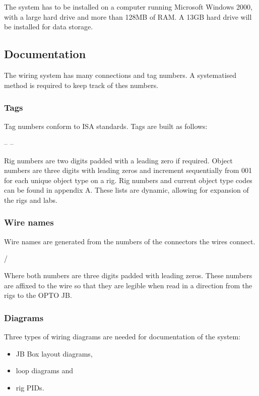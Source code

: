 The system has to be installed on a computer running Microsoft Windows 2000, with a large hard drive and more than 128MB of RAM.  A 13GB hard drive will be installed for data storage.

\subsection{Documentation}
The wiring system has many connections and tag numbers.  A systematised method is required to keep track of thes numbers.
\subsubsection{Tags}
Tag numbers conform to ISA standards.  Tags are built as follows:\bigskip

\begin{centering}
	 --  --  \bigskip \\
\end{centering}

Rig numbers are two digits padded with a leading zero if required.  Object numbers are three digits with leading zeros and increment sequentially from 001 for each unique object type on a rig.  Rig numbers and current object type codes can be found in appendix A.  These lists are dynamic, allowing for expansion of the rigs and labs.

\subsubsection{Wire names}
Wire names are generated from the numbers of the connectors the wires connect. \bigskip

\begin{centering}
  /  \bigskip \\
\end{centering}

Where both numbers are three digits padded with leading zeros.  These numbers are affixed to the wire so that they are legible when read in a direction from the rigs to the OPTO JB.

\subsubsection{Diagrams}
Three types of wiring diagrams are needed for documentation of the system:
\begin{itemize}
	\item	JB Box layout diagrams,
	\item	loop diagrams and
	\item	rig PIDs.
\end{itemize}

